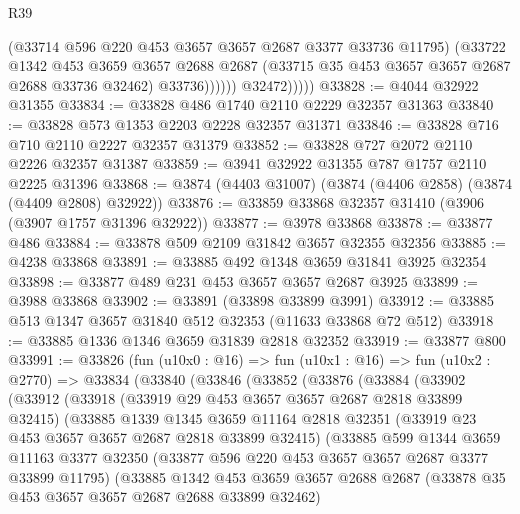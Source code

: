 \begin{lexlean}{R39}
\begin{coremodule}
                        (@33714 @596 @220 @453 @3657 @3657 @2687 @3377 @33736 @11795)
                        (@33722
                          @1342
                          @453
                          @3659
                          @3657
                          @2688
                          @2687
                          (@33715 @35 @453 @3657 @3657 @2687 @2688 @33736 @32462)
                          @33736))))))
              @32472)))))
@33828 := @4044 @32922 @31355
@33834 := @33828 @486 @1740 @2110 @2229 @32357 @31363
@33840 := @33828 @573 @1353 @2203 @2228 @32357 @31371
@33846 := @33828 @716 @710 @2110 @2227 @32357 @31379
@33852 := @33828 @727 @2072 @2110 @2226 @32357 @31387
@33859 := @3941 @32922 @31355 @787 @1757 @2110 @2225 @31396
@33868 := @3874 (@4403 @31007) (@3874 (@4406 @2858) (@3874 (@4409 @2808) @32922))
@33876 := @33859 @33868 @32357 @31410 (@3906 (@3907 @1757 @31396 @32922))
@33877 := @3978 @33868
@33878 := @33877 @486
@33884 := @33878 @509 @2109 @31842 @3657 @32355 @32356
@33885 := @4238 @33868
@33891 := @33885 @492 @1348 @3659 @31841 @3925 @32354
@33898 := @33877 @489 @231 @453 @3657 @3657 @2687 @3925
@33899 := @3988 @33868
@33902 := @33891 (@33898 @33899 @3991)
@33912 := @33885 @513 @1347 @3657 @31840 @512 @32353 (@11633 @33868 @72 @512)
@33918 := @33885 @1336 @1346 @3659 @31839 @2818 @32352
@33919 := @33877 @800
@33991 := @33826
    (fun (u10x0 : @16) =>
    fun (u10x1 : @16) =>
    fun (u10x2 : @2770) =>
    @33834
      (@33840
        (@33846
          (@33852
            (@33876
              (@33884
                (@33902
                  (@33912
                    (@33918
                      (@33919 @29 @453 @3657 @3657 @2687 @2818 @33899 @32415)
                      (@33885
                        @1339
                        @1345
                        @3659
                        @11164
                        @2818
                        @32351
                        (@33919 @23 @453 @3657 @3657 @2687 @2818 @33899 @32415)
                        (@33885
                          @599
                          @1344
                          @3659
                          @11163
                          @3377
                          @32350
                          (@33877 @596 @220 @453 @3657 @3657 @2687 @3377 @33899 @11795)
                          (@33885
                            @1342
                            @453
                            @3659
                            @3657
                            @2688
                            @2687
                            (@33878 @35 @453 @3657 @3657 @2687 @2688 @33899 @32462)

\end{coremodule}
\end{lexlean}
